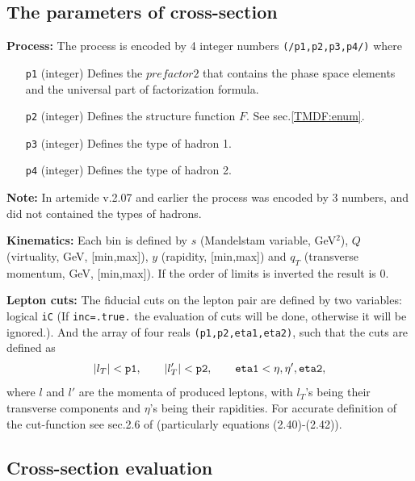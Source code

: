 \documentclass[prd,nofootinbib,eqsecnum,final]{revtex4}
\renewcommand{\(}{\left(}
\renewcommand{\)}{\right)}
\renewcommand{\[}{\left[}
\renewcommand{\]}{\right]}
\newcommand{\red}[1]{{\color[rgb]{1,0,0} #1}}
\begin{document}
\subsection{The parameters of cross-section}
\label{TMDX:setup}


\textbf{Process:} The process is encoded by 4 integer numbers \texttt{(/p1,p2,p3,p4/)} where
\begin{itemize}
\item[\texttt{p1}] (integer) Defines the $prefactor2$ that contains the phase space elements and the universal part of factorization formula. 
\item[\texttt{p2}] (integer) Defines the structure function $F$. See sec.\ref{TMDF:enum}.
\item[\texttt{p3}] (integer) Defines the type of hadron 1.
\item[\texttt{p4}] (integer) Defines the type of hadron 2.
\end{itemize}
\textbf{Note:} \red{In artemide v.2.07 and earlier} the process was encoded by 3 numbers, and did not contained the types of hadrons.

\textbf{Kinematics:} Each bin is defined by $s$ (Mandelstam variable, GeV$^2$), $Q$ (virtuality, GeV, [min,max]), $y$ (rapidity, [min,max]) and $q_T$ (transverse momentum, GeV, [min,max]). If the order of limits is inverted the result is 0.

\textbf{Lepton cuts:} The fiducial cuts on the lepton pair are defined by two variables: logical \texttt{iC} (If \texttt{inc=.true.} the evaluation of cuts will be done, otherwise it will be ignored.). And the array of four reals \texttt{(p1,p2,eta1,eta2)}, such that the cuts are defined as
\begin{eqnarray}
|l_T|<\text{\texttt{p1}},\qquad |l'_T|<\text{\texttt{p2}},\qquad \text{\texttt{eta1}}<\eta,\eta',\text{\texttt{eta2}},
\end{eqnarray}
where $l$ and $l'$ are the momenta of produced leptons, with $l_T$'s being their transverse components and $\eta$'s being their rapidities. For accurate definition of the cut-function see sec.2.6 of \cite{Scimemi:2017etj} (particularly equations (2.40)-(2.42)).

\subsection{Cross-section evaluation}
\label{TMDX:xsec}
\end{document}
